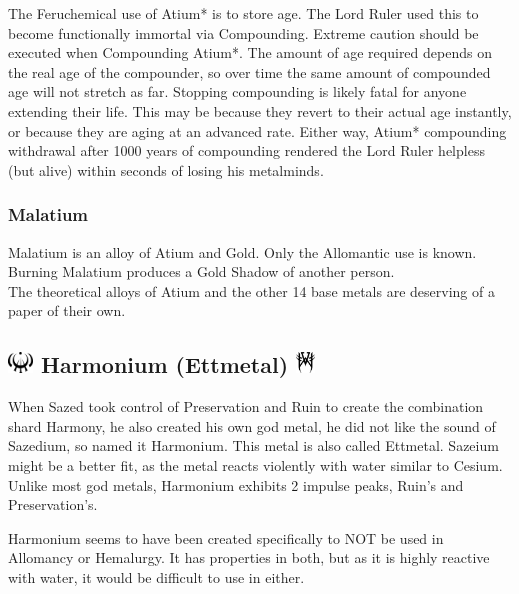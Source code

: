 \documentclass[conference]{IEEEtran}
\begin{document}
The Feruchemical use of Atium* is to store age.\cite{WoA-ARS}  The Lord Ruler used this to become functionally immortal via Compounding.\cite{AoL-CH11}  Extreme caution should be executed when Compounding Atium*.  The amount of age required depends on the real age of the compounder, so over time the same amount of compounded age will not stretch as far.  Stopping compounding is likely fatal for anyone extending their life.  This may be because they revert to their actual age instantly, or because they are aging at an advanced rate.  Either way, Atium* compounding withdrawal after 1000 years of compounding rendered the Lord Ruler helpless (but alive) within seconds of losing his metalminds.\cite{TFE-CH38}\\
\subsubsection*{\textbf{Malatium}}\hfill\break\indent
Malatium is an alloy of Atium and Gold.\cite{malatium-gold}
Only the Allomantic use is known.  Burning Malatium produces a Gold Shadow of another person.\cite{WoA-ARS}\\

The theoretical alloys of Atium and the other 14 base metals are deserving of a paper of their own.


\subsection*{\includegraphics[height=1em]{images/Ettmetal.png}  \textbf{Harmonium (Ettmetal)}\cite{harmonium-existance} \includegraphics[height=1em]{images/Ettmetal_(Feruchemy).png}}
When Sazed took control of Preservation and Ruin\cite{HoA-CH82} to create the combination shard Harmony,\cite{AoL-CH18} he also created his own god metal, he did not like the sound of Sazedium, so named it Harmonium.\cite{harmonium-existance}  This metal is also called Ettmetal.\cite{harm-ett} Sazeium might be a better fit, as the metal reacts violently with water\cite{BoM-CH22} similar to Cesium.\cite{super-cesium}\cite{cesium} Unlike most god metals, Harmonium exhibits 2 impulse peaks, Ruin's and Preservation's.

Harmonium seems to have been created specifically to NOT be used in Allomancy or Hemalurgy.  It has properties in both,\cite{FEH+} but as it is highly reactive with water,\cite{BoM-CH22} it would be difficult to use in either.\\
\end{document}
